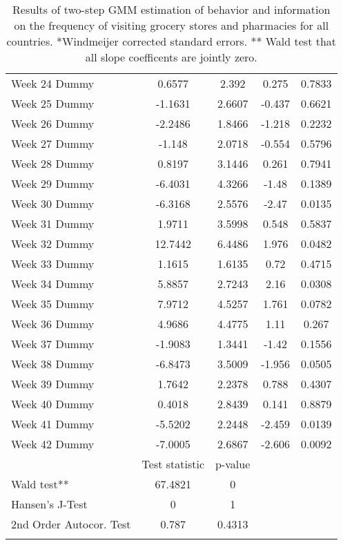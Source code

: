 \begin{longtable}{lcccc}
  Week 24 Dummy & 0.6577 & 2.392 & 0.275 & 0.7833 \\ 
  Week 25 Dummy & -1.1631 & 2.6607 & -0.437 & 0.6621 \\ 
  Week 26 Dummy & -2.2486 & 1.8466 & -1.218 & 0.2232 \\ 
  Week 27 Dummy & -1.148 & 2.0718 & -0.554 & 0.5796 \\ 
  Week 28 Dummy & 0.8197 & 3.1446 & 0.261 & 0.7941 \\ 
  Week 29 Dummy & -6.4031 & 4.3266 & -1.48 & 0.1389 \\ 
  Week 30 Dummy & -6.3168 & 2.5576 & -2.47 & 0.0135 \\ 
  Week 31 Dummy & 1.9711 & 3.5998 & 0.548 & 0.5837 \\ 
  Week 32 Dummy & 12.7442 & 6.4486 & 1.976 & 0.0482 \\ 
  Week 33 Dummy & 1.1615 & 1.6135 & 0.72 & 0.4715 \\ 
  Week 34 Dummy & 5.8857 & 2.7243 & 2.16 & 0.0308 \\ 
  Week 35 Dummy & 7.9712 & 4.5257 & 1.761 & 0.0782 \\ 
  Week 36 Dummy & 4.9686 & 4.4775 & 1.11 & 0.267 \\ 
  Week 37 Dummy & -1.9083 & 1.3441 & -1.42 & 0.1556 \\ 
  Week 38 Dummy & -6.8473 & 3.5009 & -1.956 & 0.0505 \\ 
  Week 39 Dummy & 1.7642 & 2.2378 & 0.788 & 0.4307 \\ 
  Week 40 Dummy & 0.4018 & 2.8439 & 0.141 & 0.8879 \\ 
  Week 41 Dummy & -5.5202 & 2.2448 & -2.459 & 0.0139 \\ 
  Week 42 Dummy & -7.0005 & 2.6867 & -2.606 & 0.0092 \\ 
   & Test statistic & p-value &  &  \\ 
  Wald test** & 67.4821 & 0 &  &  \\ 
  Hansen's J-Test & 0 & 1 &  &  \\ 
  2nd Order Autocor. Test & 0.787 & 0.4313 &  &  \\ 
   \bottomrule
\caption{Results of two-step GMM estimation of behavior and information on the frequency of visiting grocery stores and pharmacies for all countries. *Windmeijer corrected standard errors. ** Wald test that all slope coefficents are jointly zero.} 
\label{tab_results:grocery_full}
\end{longtable}
\endgroup

